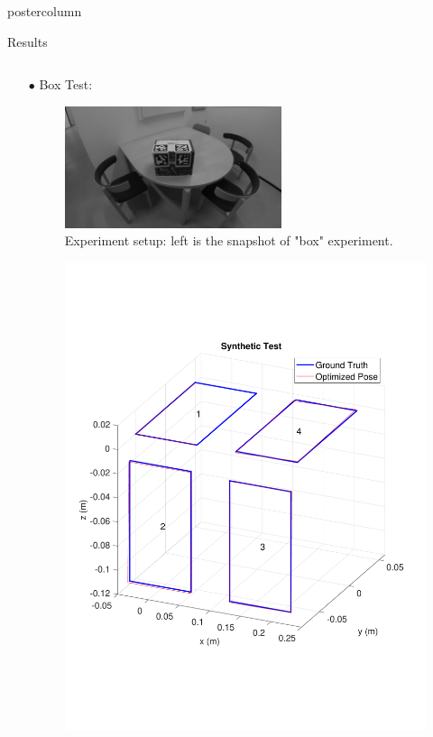 \documentclass{beamer}
\begin{document}
\begin{frame}
\begin{columns}
\begin{column}{.57\textwidth}
\begin{beamercolorbox}[center]{postercolumn}
\begin{minipage}{.98\textwidth}
{\begin{myblock}{Results}
\begin{minipage}[0.3\textheight]{\textwidth}
\begin{columns}[T]
\begin{column}{0.33\textwidth}
\begin{enumerate}[label=,labelindent=\parindent,leftmargin=*]
\item[$\bullet$] Box Test: 
\begin{figure}
\centering
\includegraphics[width=0.6\textwidth]{img/box_snap}
\caption{Experiment setup: left is the snapshot of "box" experiment.}
\label{fig:snap_table_box}
\end{figure}
\begin{figure}
\centering
\includegraphics[width=1.0\textwidth]{img/box_3d_new}

\end{figure}
\end{enumerate}
\end{column}
\end{columns}
\end{minipage}
\end{myblock}}
\end{minipage}
\end{beamercolorbox}
\end{column}
\end{columns}
\end{frame}
\end{document}
